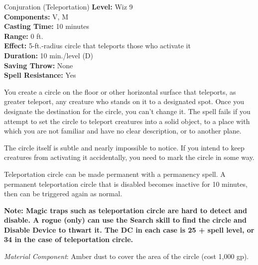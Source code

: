 {Conjuration (Teleportation)}
{
	\textbf{Level:}
	Wiz 9\\
	\textbf{Components:}
	V, M\\
	\textbf{Casting Time:}
	10 minutes\\
	\textbf{Range:}
	0 ft.\\
	\textbf{Effect:}
	5-ft.-radius circle that teleports those who activate it\\
	\textbf{Duration:}
	10 min./level (D)\\
	\textbf{Saving Throw:}
	None\\
	\textbf{Spell Resistance:}
	Yes\\
}
{
	You create a circle on the floor or other horizontal surface that teleports, as greater teleport, any creature who stands on it to a designated spot. Once you designate the destination for the circle, you can't change it. The spell fails if you attempt to set the circle to teleport creatures into a solid object, to a place with which you are not familiar and have no clear description, or to another plane.

	The circle itself is subtle and nearly impossible to notice. If you intend to keep creatures from activating it accidentally, you need to mark the circle in some way.

	Teleportation circle can be made permanent with a permanency spell. A permanent teleportation circle that is disabled becomes inactive for 10 minutes, then can be triggered again as normal.

	\textbf{Note: Magic traps such as teleportation circle are hard to detect and disable. A rogue (only) can use the Search skill to find the circle and Disable Device to thwart it. The DC in each case is 25 + spell level, or 34 in the case of teleportation circle.}

	\textit{Material Component}:
	Amber dust to cover the area of the circle (cost 1,000 gp).

}
